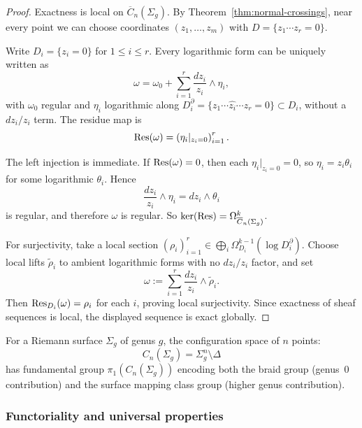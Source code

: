 \begin{proof}
Exactness is local on $\overline{C}_n(\Sigma_g)$. By
Theorem~\ref{thm:normal-crossings}, near every point we can choose coordinates
$(z_1,\dots,z_m)$ with $D=\{z_1\cdots z_r=0\}$.

Write $D_i=\{z_i=0\}$ for $1\le i\le r$. Every logarithmic form can be uniquely
written as
\[
\omega=\omega_0+\sum_{i=1}^r \frac{dz_i}{z_i}\wedge\eta_i,
\]
with $\omega_0$ regular and $\eta_i$ logarithmic along
$D_i^\partial=\{z_1\cdots \widehat{z_i}\cdots z_r=0\}\subset D_i$, without a
$dz_i/z_i$ term. The residue map is
\[
\operatorname{Res}(\omega)=\left(\eta_i|_{z_i=0}\right)_{i=1}^r.
\]

The left injection is immediate. If $\operatorname{Res}(\omega)=0$, then each
$\eta_i|_{z_i=0}=0$, so $\eta_i=z_i\theta_i$ for some logarithmic $\theta_i$.
Hence
\[
\frac{dz_i}{z_i}\wedge \eta_i = dz_i\wedge\theta_i
\]
is regular, and therefore $\omega$ is regular. So
$\ker(\operatorname{Res})=\Omega^k_{\overline{C}_n(\Sigma_g)}$.

For surjectivity, take a local section
$(\rho_i)_{i=1}^r\in\bigoplus_i\Omega^{k-1}_{D_i}(\log D_i^\partial)$.
Choose local lifts $\widetilde{\rho}_i$ to ambient logarithmic forms with no
$dz_i/z_i$ factor, and set
\[
\omega:=\sum_{i=1}^r \frac{dz_i}{z_i}\wedge \widetilde{\rho}_i.
\]
Then $\operatorname{Res}_{D_i}(\omega)=\rho_i$ for each $i$, proving local surjectivity. Since
exactness of sheaf sequences is local, the displayed sequence is exact globally.
\end{proof}

For a Riemann surface $\Sigma_g$ of genus $g$, the configuration space of $n$ points:
\[C_n(\Sigma_g) = \Sigma_g^n \setminus \Delta\]
has fundamental group $\pi_1(C_n(\Sigma_g))$ encoding both the braid group (genus~$0$ contribution) and the surface mapping class group (higher genus contribution).

\subsubsection{Functoriality and universal properties}

